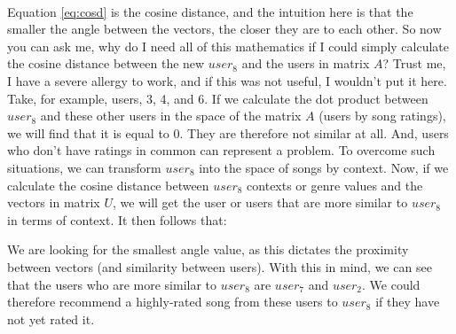 \documentclass[a4,12pt,twosided,openany]{memoir}
\begin{document}
\\
\indent Equation \ref{eq:cosd} is the cosine distance, and the intuition here is that the smaller the angle between the vectors, the closer they are to each other. So now you can ask me, why do I need all of this mathematics if I could simply calculate the cosine distance between the new $user_8$ and the users in matrix $A$? Trust me, I have a severe allergy to work, and if this was not useful, I wouldn't put it here. Take, for example, users, 3, 4, and 6. If we calculate the dot product between $user_8$ and these other users in the space of the matrix $A$ (users by song ratings), we will find that it is equal to 0. They are therefore not similar at all. And, users who don’t have ratings in common can represent a problem. To overcome such situations, we can transform $user_8$ into the space of songs by context. Now, if we calculate the cosine distance between $user_8$ contexts or genre values and the vectors in matrix $U$, we will get the user or users that are more similar to  $user_8$ in terms of context. It then follows that:

\begin{center}

\end{center}
\par 
\indent
We are looking for the smallest angle value, as this dictates the proximity between vectors (and similarity between users). With this in mind, we can see that the users who are more similar to $user_8$ are $user_7$ and $user_2$. We could therefore recommend a highly-rated song from these users to $user_8$ if they have not yet rated it.
\end{document}
